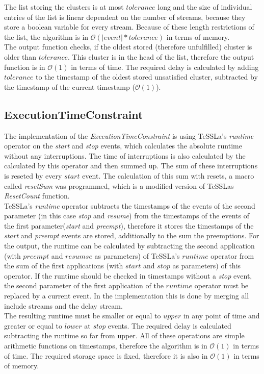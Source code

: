 	The list storing the clusters is at most $tolerance$ long and the size of individual entries of the list is linear dependent on the number of streams, because they store a boolean variable for every stream. Because of these length restrictions of the list, the algorithm is in $\mathcal{O}(|event|*tolerance)$ in terms of memory.\\
	The output function checks, if the oldest stored (therefore unfulfilled) cluster is older than $tolerance$. This cluster is in the head of the list, therefore the output function is in $\mathcal{O}(1)$ in terms of time. The required delay is calculated by adding $tolerance$ to the timestamp of the oldest stored unsatisfied cluster, subtracted by the timestamp of the current timestamp ($\mathcal{O}(1)$).
	
\subsection{ExecutionTimeConstraint}
	The implementation of the \emph{ExecutionTimeConstraint} is using TeSSLa's \emph{runtime} operator on the \emph{start} and \emph{stop} events, which calculates the absolute runtime without any interruptions. The time of interruptions is also calculated by the calculated by this operator and then summed up. The sum of these interruptions is reseted by every $start$ event. The calculation of this sum with resets, a macro called \textit{resetSum} was programmed, which is a modified version of TeSSLas \textit{ResetCount} function.\\
	TeSSLa's \emph{runtime} operator subtracts the timestamps of the events of the second parameter (in this case \emph{stop} and \emph{resume}) from the timestamps of the events of the first parameter(\emph{start} and \emph{preempt}), therefore it stores the timestamps of the \emph{start} and \emph{preempt} events are stored, additionally to the sum the preemptions.
	For the output, the runtime can be calculated by subtracting the second application (with $preempt$ and $resumse$ as parameters) of TeSSLa's $runtime$ operator from the sum of the first applications (with $start$ and $stop$ as parameters) of this operator. If the runtime should be checked in timestamps without a \emph{stop} event, the second parameter of the first application of the $runtime$ operator must be replaced by a current event. In the implementation this is done by merging all include streams and the delay stream.\\
	The resulting runtime must be smaller or equal to $upper$ in any point of time and greater or equal to $lower$ at \emph{stop} events. The required delay is calculated subtracting the runtime so far from upper. All of these operations are simple arithmetic functions on timestamps, therefore the algorithm is in $\mathcal{O}(1)$ in terms of time. The required storage space is fixed, therefore it is also in $\mathcal{O}(1)$ in terms of memory.

